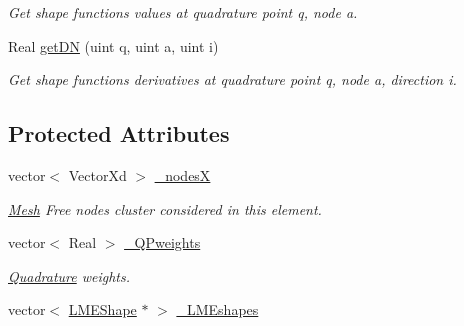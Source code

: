 \begin{DoxyCompactItemize}
\begin{DoxyCompactList}\small\item\em Get shape functions values at quadrature point q, node a. \item\end{DoxyCompactList}\item 
\hypertarget{classvoom_1_1_l_m_egeom_element_a3817d182fdaf81da2f6add4063e8a41a}{
Real \hyperlink{classvoom_1_1_l_m_egeom_element_a3817d182fdaf81da2f6add4063e8a41a}{getDN} (uint q, uint a, uint i)}
\label{classvoom_1_1_l_m_egeom_element_a3817d182fdaf81da2f6add4063e8a41a}

\begin{DoxyCompactList}\small\item\em Get shape functions derivatives at quadrature point q, node a, direction i. \item\end{DoxyCompactList}\end{DoxyCompactItemize}
\subsection*{Protected Attributes}
\begin{DoxyCompactItemize}
\item 
\hypertarget{classvoom_1_1_l_m_egeom_element_ae277b8c3096dd2c6fe7cde9ddcc5e986}{
vector$<$ VectorXd $>$ \hyperlink{classvoom_1_1_l_m_egeom_element_ae277b8c3096dd2c6fe7cde9ddcc5e986}{\_\-nodesX}}
\label{classvoom_1_1_l_m_egeom_element_ae277b8c3096dd2c6fe7cde9ddcc5e986}

\begin{DoxyCompactList}\small\item\em \hyperlink{classvoom_1_1_mesh}{Mesh} Free nodes cluster considered in this element. \item\end{DoxyCompactList}\item 
\hypertarget{classvoom_1_1_l_m_egeom_element_a7b2733aa8ae313acd9bf9591d5d1fb46}{
vector$<$ Real $>$ \hyperlink{classvoom_1_1_l_m_egeom_element_a7b2733aa8ae313acd9bf9591d5d1fb46}{\_\-QPweights}}
\label{classvoom_1_1_l_m_egeom_element_a7b2733aa8ae313acd9bf9591d5d1fb46}

\begin{DoxyCompactList}\small\item\em \hyperlink{classvoom_1_1_quadrature}{Quadrature} weights. \item\end{DoxyCompactList}\item 
vector$<$ \hyperlink{classvoom_1_1_l_m_e_shape}{LMEShape} $\ast$ $>$ \hyperlink{classvoom_1_1_l_m_egeom_element_a76909b4c2030b797f17106f5bc5e3b11}{\_\-LMEshapes}
\end{DoxyCompactItemize}



